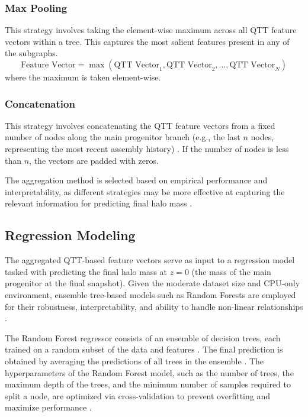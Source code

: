 \documentclass[twocolumn]{aastex631}
\begin{document}
\subsubsection{Max Pooling}
This strategy involves taking the element-wise maximum across all QTT feature vectors within a tree. This captures the most salient features present in any of the subgraphs.
\[
\text{Feature Vector} = \max(\text{QTT Vector}_1, \text{QTT Vector}_2, ..., \text{QTT Vector}_N)
\]
where the maximum is taken element-wise.

\subsubsection{Concatenation}
This strategy involves concatenating the QTT feature vectors from a fixed number of nodes along the main progenitor branch (e.g., the last \(n\) nodes, representing the most recent assembly history) \citep{ye2024quantizedtensornetworkssolving,ye2024quantizedtensornetworkssolving}. If the number of nodes is less than \(n\), the vectors are padded with zeros.

The aggregation method is selected based on empirical performance and interpretability, as different strategies may be more effective at capturing the relevant information for predicting final halo mass \citep{larson2024predictingdarkmatterhalo,cui2024knowhalomassfunction}.

\subsection{Regression Modeling}
The aggregated QTT-based feature vectors serve as input to a regression model tasked with predicting the final halo mass at \(z=0\) (the mass of the main progenitor at the final snapshot). Given the moderate dataset size and CPU-only environment, ensemble tree-based models such as Random Forests are employed for their robustness, interpretability, and ability to handle non-linear relationships \citep{larson2024predictingdarkmatterhalo}.

The Random Forest regressor consists of an ensemble of decision trees, each trained on a random subset of the data and features \citep{reis2018probabilisticrandomforestmachine}. The final prediction is obtained by averaging the predictions of all trees in the ensemble \citep{reis2018probabilisticrandomforestmachine}. The hyperparameters of the Random Forest model, such as the number of trees, the maximum depth of the trees, and the minimum number of samples required to split a node, are optimized via cross-validation to prevent overfitting and maximize performance \citep{reis2018probabilisticrandomforestmachine}.
\end{document}
